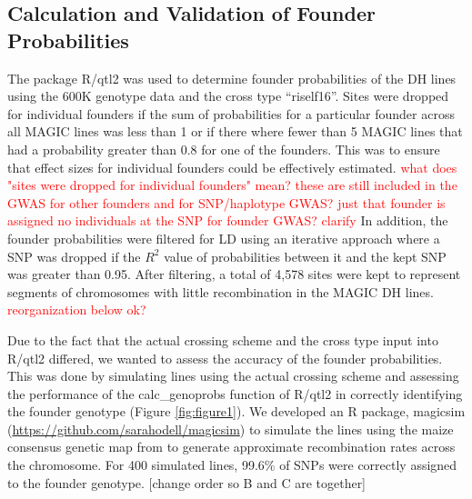 \documentclass[article,9pt,twocolumn,twoside]{rilabRxiv}
\newcommand{\jri}[1]{{\small \textcolor{red}{#1}}}
\begin{document}
\subsection{Calculation and Validation of Founder Probabilities}
The package R/qtl2 \citep{RN2} was used to determine founder probabilities of the DH lines using the 600K genotype data and the cross type ``riself16''.
Sites were dropped for individual founders if the sum of probabilities for a particular founder across all MAGIC lines was less than 1 or if there where fewer than 5 MAGIC lines that had a probability greater than 0.8 for one of the founders.
This was to ensure that effect sizes for individual founders could be effectively estimated. \jri{what does "sites were dropped for individual founders" mean? these are still included in the GWAS for other founders and for SNP/haplotype GWAS? just that founder is assigned no individuals at the SNP for founder GWAS? clarify}
In addition, the founder probabilities were filtered for LD using an iterative approach where a SNP was dropped if the $R^2$ value of probabilities between it and the kept SNP was greater than 0.95.
After filtering, a total of 4,578 sites were kept to represent segments of chromosomes with little recombination in the MAGIC DH lines. \jri{reorganization below ok?}

Due to the fact that the actual crossing scheme and the cross type input into R/qtl2 differed, we wanted to assess the accuracy of the founder probabilities.
This was done by simulating lines using the actual crossing scheme and assessing the performance of the calc\_genoprobs function of R/qtl2 in correctly identifying the founder genotype (Figure \ref{fig:figure1}).
We developed an R package, magicsim (\url{https://github.com/sarahodell/magicsim}) to simulate the lines using the maize consensus genetic map from \citep{ogut2015joint} to generate approximate recombination rates across the chromosome.
For 400 simulated lines, 99.6\% of SNPs were correctly assigned to the founder genotype.
[change order so B and C are together]
\end{document}
